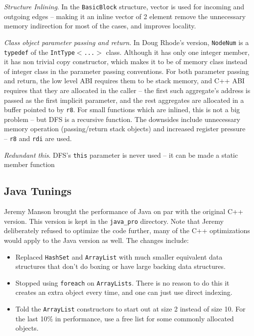 {\em Structure Inlining}. In the {\tt BasicBlock} structure, vector is used
  for incoming and outgoing edges -- making it an inline vector of 2
  element remove the unnecessary memory indirection for most of the
  cases, and improves locality.


{\em Class object parameter passing and return}. In Doug Rhode's version,
  {\tt NodeNum} is a {\tt typedef} of the {\tt IntType$<$...$>$}
  class.  Although it has only one integer member, it has non trivial
  copy constructor, which makes it to be of memory class instead of
  integer class in the parameter passing conventions.  For both
  parameter passing and return, the low level ABI requires them to be
  stack memory, and C++ ABI requires that they are allocated in the
  caller -- the first such aggregate's address is passed as the first
  implicit parameter, and the rest aggregates are allocated in a
  buffer pointed to by {\tt r8}. For small functions which are inlined, this
  is not a big problem -- but DFS is a recursive function. The
  downsides include unnecessary memory operation (passing/return
  stack objects) and increased register pressure -- {\tt r8} and {\tt rdi} are
  used.

{\em Redundant this}. DFS's  {\tt this} parameter is never used -- it can be made a static member function

\subsection{Java Tunings}

Jeremy Manson brought the performance of Java on par with the original
C++ version.  This version is kept in the {\tt java\_pro}
directory. Note that Jeremy deliberately refused to optimize the code
further, many of the C++ optimizations would apply to the Java version
as well. The changes include:

\begin{itemize}

\item Replaced {\tt HashSet} and {\tt ArrayList} with much smaller
  equivalent data structures that don't do boxing or have large
  backing data structures.

\item Stopped using {\tt foreach} on {\tt ArrayLists}.  There is no
  reason to do this it creates an extra object every time, and one can
  just use direct indexing.

\item Told the {\tt ArrayList} constructors to start out at size 2
  instead of size 10.  For the last 10\% in performance, use a free
  list for some commonly allocated objects.

\end{itemize}


